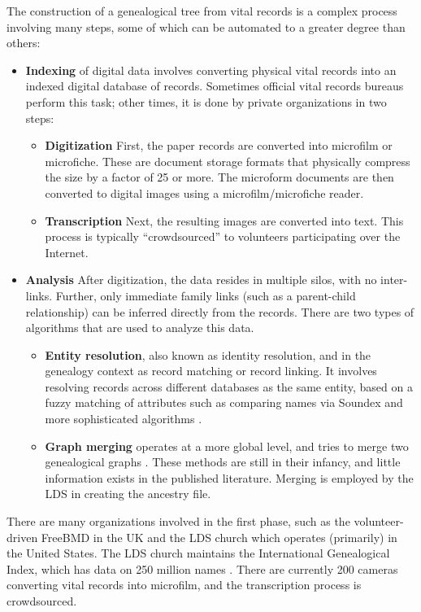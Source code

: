 \documentclass{article}
\begin{document}
The construction of a genealogical tree from vital records is a complex process involving many steps, some of which can be automated to a greater degree than others:
\begin{itemize}
\item {\bf Indexing} of digital data involves converting physical vital records into an indexed digital database of records. Sometimes official vital records bureaus perform this task; other times, it is done by private organizations in two steps:
\begin{itemize}
\item {\bf Digitization} First, the paper records are converted into microfilm or microfiche. These are document storage formats that physically compress the size by a factor of 25 or more.\cite{wikipedia}  The microform documents are then converted to digital images using a microfilm/microfiche reader. 
\item {\bf Transcription} Next, the resulting images are converted into text. This process is  typically ``crowdsourced'' to volunteers participating over the Internet.
\end{itemize}
\item {\bf Analysis} After digitization, the data resides in multiple silos, with no inter-links. Further, only immediate family links (such as a parent-child relationship) can be inferred directly from the records. There are two types of algorithms that are used to analyze this data.
\begin{itemize}
\item {\bf Entity resolution}, also known as identity resolution, and in the genealogy context as record matching or record linking. It involves resolving records across different databases as the same entity, based on a fuzzy matching of attributes such as comparing names via Soundex and more sophisticated algorithms \cite{Lait_and_Randall_An_Assessment_of_Name_Matching_Algorithms}.
\item {\bf Graph merging} operates at a more global level, and tries to merge two genealogical graphs \cite{wilson-remerging}. These methods are still in their infancy, and little information exists in the published literature. Merging is employed by the LDS in creating the ancestry file. 
\end{itemize}

\end{itemize}

There are many organizations involved in the first phase, such as the volunteer-driven FreeBMD in the UK \cite{freebmd} and the LDS church which operates (primarily) in the United States. The LDS church maintains the International Genealogical Index, which has data on 250 million names \cite{familysearch}. There are currently 200 cameras converting vital records into microfilm, and the transcription process is crowdsourced. 
\end{document}
